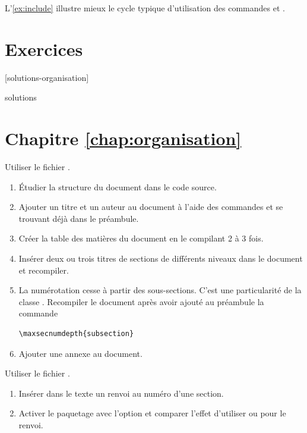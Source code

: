 L'\autoref{ex:include} illustre mieux le cycle typique
d'utilisation des commandes \cmd{} et \cmd{}.




\section{Exercices}
\label{sec:organisation:exercices}

[solutions-organisation]

\begin{Filesave}{solutions}
\section*{Chapitre \ref*{chap:organisation}}

\end{Filesave}

\begin{exercice}[nosol]
  Utiliser le fichier .
  \begin{enumerate}
  \item Étudier la structure du document dans le code source.
  \item Ajouter un titre et un auteur au document à l'aide des
    commandes \cmdprint{\title} et \cmdprint{\author} se trouvant déjà
    dans le préambule.
  \item Créer la table des matières du document en le compilant 2 à 3
    fois.
  \item Insérer deux ou trois titres de sections de différents niveaux
    dans le document et recompiler.
  \item La numérotation cesse à partir des sous-sections. C'est une
    particularité de la classe . Recompiler le document
    après avoir ajouté au préambule la commande
\begin{lstlisting}
\maxsecnumdepth{subsection}
\end{lstlisting}
  \item Ajouter une annexe au document.
  \end{enumerate}
\end{exercice}

\begin{exercice}[nosol]
  Utiliser le fichier .
  \begin{enumerate}
  \item Insérer dans le texte un renvoi au numéro d'une section.
  \item Activer le paquetage  avec l'option
     et comparer l'effet d'utiliser \cmd{\ref} ou
    \cmd{\autoref} pour le renvoi.
  \end{enumerate}
\end{exercice}


